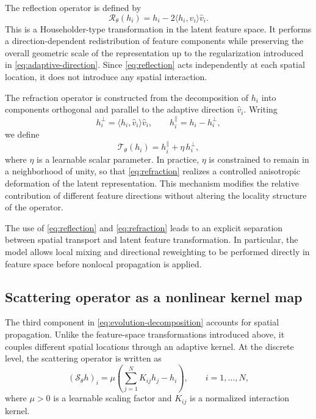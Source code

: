 \documentclass{article}
\begin{document}
The reflection operator is defined by
\begin{equation}
\mathcal{R}_\theta(h_i)
=
h_i - 2 \langle h_i, \widehat{v}_i \rangle \widehat{v}_i.
\label{eq:reflection}
\end{equation}
This is a Householder-type transformation in the latent feature space. It performs a direction-dependent redistribution of feature components while preserving the overall geometric scale of the representation up to the regularization introduced in \eqref{eq:adaptive-direction}. Since \eqref{eq:reflection} acts independently at each spatial location, it does not introduce any spatial interaction.

The refraction operator is constructed from the decomposition of $h_i$ into components orthogonal and parallel to the adaptive direction $\widehat{v}_i$. Writing
\begin{equation}
h_i^{\perp}
=
\langle h_i, \widehat{v}_i \rangle \widehat{v}_i,
\qquad
h_i^{\parallel}
=
h_i - h_i^{\perp},
\end{equation}
we define
\begin{equation}
\mathcal{T}_\theta(h_i)
=
h_i^{\parallel}
+
\eta \, h_i^{\perp},
\label{eq:refraction}
\end{equation}
where $\eta$ is a learnable scalar parameter. In practice, $\eta$ is constrained to remain in a neighborhood of unity, so that \eqref{eq:refraction} realizes a controlled anisotropic deformation of the latent representation. This mechanism modifies the relative contribution of different feature directions without altering the locality structure of the operator.

The use of \eqref{eq:reflection} and \eqref{eq:refraction} leads to an explicit separation between spatial transport and latent feature transformation. In particular, the model allows local mixing and directional reweighting to be performed directly in feature space before nonlocal propagation is applied.

\subsection{Scattering operator as a nonlinear kernel map}

The third component in \eqref{eq:evolution-decomposition} accounts for spatial propagation. Unlike the feature-space transformations introduced above, it couples different spatial locations through an adaptive kernel. At the discrete level, the scattering operator is written as
\begin{equation}
(\mathcal{S}_\theta h)_i
=
\mu
\left(
\sum_{j=1}^N K_{ij} h_j - h_i
\right),
\qquad i=1,\dots,N,
\label{eq:scattering-discrete}
\end{equation}
where $\mu > 0$ is a learnable scaling factor and $K_{ij}$ is a normalized interaction kernel.
\end{document}
